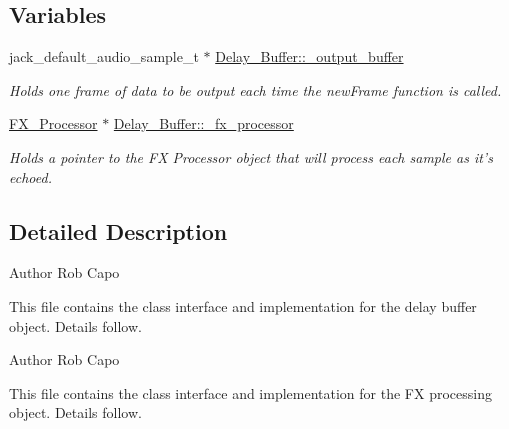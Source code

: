 \subsection*{Variables}
\begin{DoxyCompactItemize}
\item 
\hypertarget{group___f_x_ga82a3ce8e6e0e8e1e77add80058d5231c}{jack\+\_\+default\+\_\+audio\+\_\+sample\+\_\+t $\ast$ \hyperlink{group___f_x_ga82a3ce8e6e0e8e1e77add80058d5231c}{Delay\+\_\+\+Buffer\+::\+\_\+output\+\_\+buffer}}\label{group___f_x_ga82a3ce8e6e0e8e1e77add80058d5231c}

\begin{DoxyCompactList}\small\item\em Holds one frame of data to be output each time the {\ttfamily new\+Frame} function is called. \end{DoxyCompactList}\item 
\hypertarget{group___f_x_gacaec3734e7f9717589775bc1bd9a1a08}{\hyperlink{class_f_x___processor}{F\+X\+\_\+\+Processor} $\ast$ \hyperlink{group___f_x_gacaec3734e7f9717589775bc1bd9a1a08}{Delay\+\_\+\+Buffer\+::\+\_\+fx\+\_\+processor}}\label{group___f_x_gacaec3734e7f9717589775bc1bd9a1a08}

\begin{DoxyCompactList}\small\item\em Holds a pointer to the F\+X Processor object that will process each sample as it's echoed. \end{DoxyCompactList}\end{DoxyCompactItemize}


\subsection{Detailed Description}
\begin{DoxyAuthor}{Author}
Rob Capo
\end{DoxyAuthor}
This file contains the class interface and implementation for the delay buffer object. Details follow.

\begin{DoxyAuthor}{Author}
Rob Capo
\end{DoxyAuthor}
This file contains the class interface and implementation for the F\+X processing object. Details follow. 

